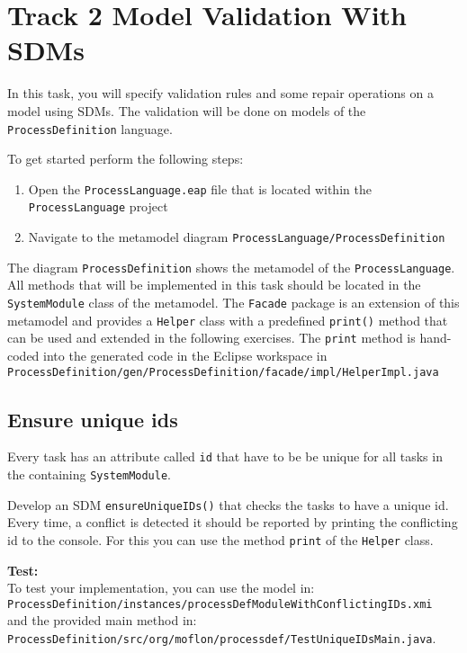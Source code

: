 \section{Track 2 Model Validation With SDMs}

In this task, you will specify validation rules and some repair operations on a model using SDMs.
The validation will be done on models of the \texttt{ProcessDefinition} language.

To get started perform the following steps:
\begin{enumerate}
\item Open the \texttt{ProcessLanguage.eap} file that is located within the \texttt{ProcessLanguage} project
\item Navigate to the metamodel diagram \texttt{ProcessLanguage\slash ProcessDefinition} 
\end{enumerate}
The diagram \texttt{ProcessDefinition} shows the metamodel of the \texttt{ProcessLanguage}.
All methods that will be implemented in this task should be located in the \texttt{SystemModule} class of the metamodel.
The \texttt{Facade} package is an extension of this metamodel and provides a \texttt{Helper} class with a predefined \texttt{print()} method that can be used and extended in the following exercises.
The \texttt{print} method is hand-coded into the generated code in the Eclipse workspace in \texttt{ProcessDefinition\slash gen\slash ProcessDefinition\slash facade\slash impl\slash HelperImpl.java}


\subsection{Ensure unique ids}
Every task has an attribute called \texttt{id} that have to be be unique for all tasks in the containing \texttt{SystemModule}.

Develop an SDM \texttt{ensureUniqueIDs()} that checks the tasks to have a unique id.
Every time, a conflict is detected it should be reported by printing the conflicting id to the console.
For this you can use the method \texttt{print} of the \texttt{Helper} class. 

\textbf{Test:}\\ To test your implementation, you can use the model in:\\
\noindent\hspace*{10mm}\texttt{ProcessDefinition\slash instances\slash processDefModuleWithConflictingIDs.xmi}\\
and the provided main method in:\\
\noindent\hspace*{10mm}\texttt{ProcessDefinition\slash src\slash org\slash moflon\slash processdef\slash TestUniqueIDsMain.java}.\\

